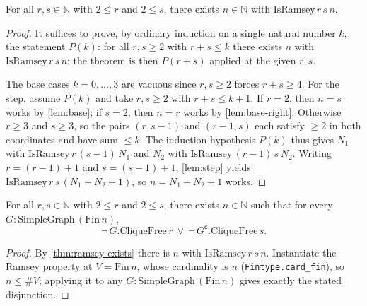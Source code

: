 \begin{theorem}
    \label{thm:ramsey-exists}
    \leanok
    For all $r, s \in \mathbb{N}$ with $2 \le r$ and $2 \le s$, there exists
    $n \in \mathbb{N}$ with $\mathrm{IsRamsey}\, r\, s\, n$.
\end{theorem}
\begin{proof}
    It suffices to prove, by ordinary induction on a single natural number $k$, the
    statement $P(k)$: for all $r, s \ge 2$ with $r + s \le k$ there exists $n$ with
    $\mathrm{IsRamsey}\, r\, s\, n$; the theorem is then $P(r+s)$ applied at the
    given $r, s$.

    The base cases $k = 0, \dots, 3$ are vacuous since $r, s \ge 2$ forces
    $r + s \ge 4$. For the step, assume $P(k)$ and take $r, s \ge 2$ with
    $r + s \le k + 1$. If $r = 2$, then $n = s$ works by \cref{lem:base}; if
    $s = 2$, then $n = r$ works by \cref{lem:base-right}. Otherwise $r \ge 3$ and
    $s \ge 3$, so the pairs $(r, s{-}1)$ and $(r{-}1, s)$ each satisfy
    $\ge 2$ in both coordinates and have sum $\le k$. The induction hypothesis
    $P(k)$ thus gives $N_1$ with $\mathrm{IsRamsey}\, r\,(s{-}1)\, N_1$ and $N_2$
    with $\mathrm{IsRamsey}\,(r{-}1)\, s\, N_2$. Writing $r = (r{-}1){+}1$ and
    $s = (s{-}1){+}1$, \cref{lem:step} yields
    $\mathrm{IsRamsey}\, r\, s\,(N_1 + N_2 + 1)$, so $n = N_1 + N_2 + 1$ works.
\end{proof}

\begin{theorem}
    \label{thm:main}
    \leanok
    For all $r, s \in \mathbb{N}$ with $2 \le r$ and $2 \le s$, there exists
    $n \in \mathbb{N}$ such that for every $G : \mathrm{SimpleGraph}\,(\mathrm{Fin}\, n)$,
    \[
        \neg\, G.\mathrm{CliqueFree}\, r \ \lor\ \neg\, G^{\mathsf c}.\mathrm{CliqueFree}\, s .
    \]
\end{theorem}
\begin{proof}
    By \cref{thm:ramsey-exists} there is $n$ with $\mathrm{IsRamsey}\, r\, s\, n$.
    Instantiate the Ramsey property at $V = \mathrm{Fin}\, n$, whose cardinality is
    $n$ (\texttt{Fintype.card\_fin}), so $n \le \#V$; applying it to any
    $G : \mathrm{SimpleGraph}\,(\mathrm{Fin}\, n)$ gives exactly the stated
    disjunction.
\end{proof}


